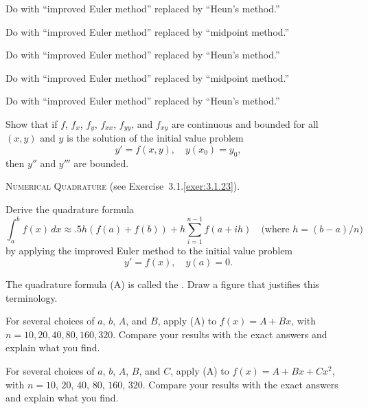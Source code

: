 \begin{exerciselist}
\item\label{exer:3.2.26}\Cex
Do  with ``improved Euler method''
replaced by ``Heun's method.''

\item\label{exer:3.2.27}\Cex
Do  with ``improved Euler method''
replaced by ``midpoint method.''

\item\label{exer:3.2.28}\Cex
Do  with ``improved Euler method''
replaced by ``Heun's method.''

\item\label{exer:3.2.29}\Cex
Do  with ``improved Euler method''
replaced by ``midpoint method.''

\item\label{exer:3.2.30}\Cex
Do  with ``improved Euler method''
replaced by ``Heun's method.''

\item\label{exer:3.2.31}Show that if $f$, $f_x$, $f_y$, $f_{xx}$, $f_{yy}$, and $f_{xy}$ are
continuous and bounded for all $(x,y)$ and $y$ is the solution of the
initial value problem
\[
y'=f(x,y),\quad y(x_0)=y_0,
\]
then $y''$ and $y'''$ are bounded.

\item\label{exer:3.2.32}{\scshape Numerical Quadrature} (see {Exercise~3.1.\ref{exer:3.1.23}}).
\begin{alist}
\item %
Derive the quadrature formula
\[
\int_a^bf(x)\,dx\approx .5h(f(a)+f(b))+
h\sum_{i=1}^{n-1}f(a+ih)\quad\text{(where $h=(b-a)/n$)}\tag{A}
\]
by applying the improved Euler method to the initial value problem
\[
y'=f(x),\quad y(a)=0.
\]
\item %
The quadrature formula (A) is  called the . Draw a figure that justifies this terminology.
\item %
\Lex
For several choices of $a$, $b$, $A$,  and $B$,
 apply (A) to $f(x)=A+Bx$, with $n = 10,20,40,80,160,320$.
Compare your results with the exact answers
and explain what you find.
\item %
\Lex
For several choices of $a$, $b$, $A$, $B$, and $C$,
 apply (A) to $f(x)=A+Bx+Cx^2$, with $n=10$, $20$, $40$, $80$, $160$,
$320$.
 Compare your results with the exact answers
and explain what you find.
\end{alist}

\end{exerciselist}

